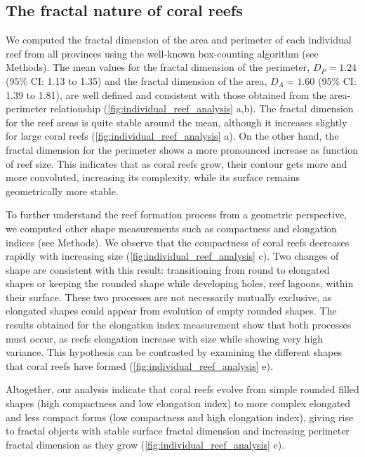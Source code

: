 \subsection{The fractal nature of coral reefs}

We computed the fractal dimension of the area and perimeter of each
individual reef from all provinces using the well-known box-counting algorithm
(see Methods). The mean values for the fractal dimension of the perimeter,
$D_P=1.24$ (95\% CI: 1.13 to 1.35) and the fractal dimension of the area,
$D_A=1.60$ (95\% CI: 1.39 to 1.81), are well defined and consistent with those
obtained from the area-perimeter relationship
(\cref{fig:individual_reef_analysis} a,b). The fractal dimension for the reef
areas is quite stable around the mean, although it increases slightly for large
coral reefs (\cref{fig:individual_reef_analysis} a). On the other hand, the
fractal dimension for the perimeter shows a more pronounced increase as
function of reef size. This indicates that as coral reefs grow, their contour
gets more and more convoluted, increasing its complexity, while its surface
remains geometrically more stable.

To further understand the reef formation process from a geometric
perspective, we computed other shape measurements such as compactness and
elongation indices (see Methods). We observe that the compactness of coral
reefs decreases rapidly with increasing size
(\cref{fig:individual_reef_analysis} c). Two changes of shape are consistent
with this result: transitioning from round to elongated shapes or keeping the
rounded shape while developing holes, reef lagoons, within their surface. These
two processes are not necessarily mutually exclusive, as elongated shapes could
appear from evolution of empty rounded shapes. The results obtained for the
elongation index measurement show that both processes must occur, as reefs
elongation increase with size while showing very high variance. This hypothesis
can be contrasted by examining the different shapes that coral reefs have
formed (\cref{fig:individual_reef_analysis} e).

Altogether, our analysis indicate that coral reefs evolve from simple
rounded filled shapes (high compactness and low elongation index) to more
complex elongated and less compact forms (low compactness and high elongation
index), giving rise to fractal objects with stable surface fractal dimension
and increasing perimeter fractal dimension as they grow
(\cref{fig:individual_reef_analysis} e).

